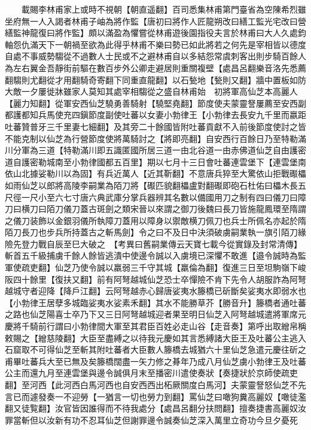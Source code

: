 　　載賜李林甫家上或時不視朝【朝直遥翻】百司悉集林甫第門臺省為空陳希烈雖坐府無一人入謁者林甫子岫為將作監【唐初曰將作人匠龍朔改曰繕工監光宅改曰營繕監神龍復曰將作監】頗以滿盈為懼嘗從林甫遊後園指役夫言於林甫曰大人久處鈞軸怨仇滿天下一朝禍至欲為此得乎林甫不樂曰勢已如此將若之何先是宰相皆以德度自處不事威勢騶從不過數人士民或不之避林甫自以多結怨常虞刺客出則步騎百餘人為左右翼金吾靜街前驅在數百步外公卿走避居則重關複壁【處昌呂翻樂音洛先悉薦翻騶則尤翻從才用翻騎奇寄翻下同重直龍翻】以石甃地【甃則又翻】牆中置板如防大敵一夕屢徙牀雖家人莫知其處宰相騶從之盛自林甫始　初將軍高仙芝本高麗人【麗力知翻】從軍安西仙芝驍勇善騎射【驍堅堯翻】節度使夫蒙靈詧屢薦至安西副都護都知兵馬使充四鎭節度副使吐蕃以女妻小勃律王【小勃律去長安九千里而嬴距吐蕃贊普牙三千里妻七細翻】及其旁二十餘國皆附吐蕃貢獻不入前後節度使討之皆不能克制以仙芝為行營節度使將萬騎討之【將即亮翻】自安西行百餘日乃至特勒滿川分軍為三道【特勒滿川即五識匿國所居三道一由北谷道一由赤佛道仙芝自由護密道自護密勒城南至小勃律國都五百里】期以七月十三日會吐蕃連雲堡下【連雲堡南依山北據娑勒川以為固】有兵近萬人【近其靳翻】不意唐兵猝至大驚依山拒戰礟櫑如雨仙芝以郎將高陵李嗣業為陌刀將【礟匹貌翻櫑盧對翻礟即砲石杜佑曰櫑木長五尺徑一尺小至六七寸唐六典武庫分掌兵器辨其名數以備國用刀之制有四曰儀刀曰障刀曰横刀曰陌刀儀刀蓋古斑劍之類宋晉以來謂之御刀後魏曰長刀皆施龍鳳環至隋謂之儀刀装飾以金銀羽儀所執障刀蓋用以障身以禦敵横刀佩刀也兵士所佩名亦起於隋陌刀長刀也步兵所持蓋古之斬馬劍】令之曰不及日中決須破虜嗣業執一旗引陌刀緣險先登力戰自辰至巳大破之　【考異曰舊嗣業傳云天寶七載今從實錄及封常清傳】斬首五千級捕虜千餘人餘皆逃潰中使邊令誠以入虜境已深懼不敢進【邉令誠時為監軍使疏吏翻】仙芝乃使令誠以羸弱三千守其城【羸倫為翻】復進三日至坦駒嶺下峻阪四十餘里【復扶又翻】前有阿弩越城仙芝恐士卒憚險不肯下先令人胡服詐為阿弩越城守者迎降【降戶江翻】云阿弩越赤心歸唐娑夷水籐橋已斫斷矣娑夷水即弱水也【小勃律王居孽多城臨娑夷水娑素禾翻】其水不能勝草芥【勝音升】籐橋者通吐蕃之路也仙芝陽喜士卒乃下又三日阿弩越城迎者果至明日仙芝入阿弩越城遣將軍席元慶將千騎前行謂曰小勃律間大軍至其君臣百姓必走山谷【走音奏】第呼出取繒帛稱敕賜之【繒慈陵翻】大臣至盡縛之以待我元慶如其言悉縛諸大臣王及吐蕃公主逃入石窟取不可得仙芝至斬其附吐蕃者大臣數人籐橋去城猶六十里仙芝急遣元慶往斫之甫畢吐蕃兵大至已無及矣籐橋闊盡一矢力修之朞年乃成八月仙芝虜小勃律王及吐蕃公主而還九月至連雲堡與邊令誠俱月末至播密川遣使奏狀【奏捷狀於京師使疏吏翻】至河西【此河西白馬河西也自安西西出柘厥關度白馬河】夫蒙靈詧怒仙芝不先言已而遽發奏一不迎勞【一猶言一切也勞力到翻】罵仙芝曰噉狗糞高麗奴【噉徒濫翻又徒覧翻】汝官皆因誰得而不待我處分【處昌呂翻分扶問翻】擅奏捷書高麗奴汝罪當斬但以汝新有功不忍耳仙芝但謝罪邊令誠奏仙芝深入萬里立奇功今旦夕憂死

